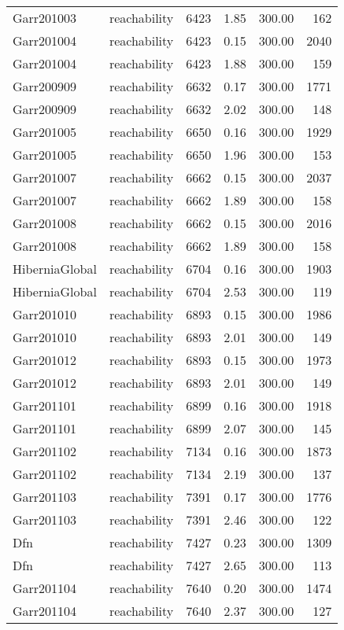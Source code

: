 \begin{tabular}{llrrrr}
Garr201003 & reachability & 6423 & 1.85 & 300.00 & 162 \\
Garr201004 & reachability & 6423 & 0.15 & 300.00 & 2040 \\
Garr201004 & reachability & 6423 & 1.88 & 300.00 & 159 \\
Garr200909 & reachability & 6632 & 0.17 & 300.00 & 1771 \\
Garr200909 & reachability & 6632 & 2.02 & 300.00 & 148 \\
Garr201005 & reachability & 6650 & 0.16 & 300.00 & 1929 \\
Garr201005 & reachability & 6650 & 1.96 & 300.00 & 153 \\
Garr201007 & reachability & 6662 & 0.15 & 300.00 & 2037 \\
Garr201007 & reachability & 6662 & 1.89 & 300.00 & 158 \\
Garr201008 & reachability & 6662 & 0.15 & 300.00 & 2016 \\
Garr201008 & reachability & 6662 & 1.89 & 300.00 & 158 \\
HiberniaGlobal & reachability & 6704 & 0.16 & 300.00 & 1903 \\
HiberniaGlobal & reachability & 6704 & 2.53 & 300.00 & 119 \\
Garr201010 & reachability & 6893 & 0.15 & 300.00 & 1986 \\
Garr201010 & reachability & 6893 & 2.01 & 300.00 & 149 \\
Garr201012 & reachability & 6893 & 0.15 & 300.00 & 1973 \\
Garr201012 & reachability & 6893 & 2.01 & 300.00 & 149 \\
Garr201101 & reachability & 6899 & 0.16 & 300.00 & 1918 \\
Garr201101 & reachability & 6899 & 2.07 & 300.00 & 145 \\
Garr201102 & reachability & 7134 & 0.16 & 300.00 & 1873 \\
Garr201102 & reachability & 7134 & 2.19 & 300.00 & 137 \\
Garr201103 & reachability & 7391 & 0.17 & 300.00 & 1776 \\
Garr201103 & reachability & 7391 & 2.46 & 300.00 & 122 \\
Dfn & reachability & 7427 & 0.23 & 300.00 & 1309 \\
Dfn & reachability & 7427 & 2.65 & 300.00 & 113 \\
Garr201104 & reachability & 7640 & 0.20 & 300.00 & 1474 \\
Garr201104 & reachability & 7640 & 2.37 & 300.00 & 127 \\

\end{tabular}
